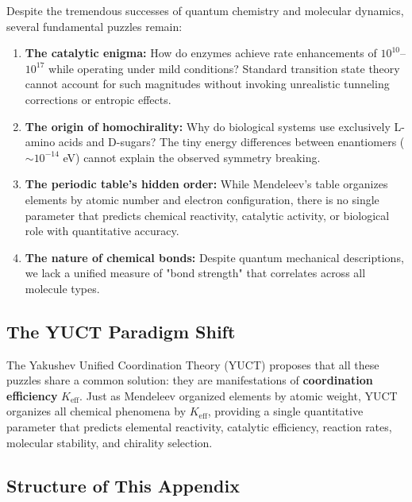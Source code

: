 \documentclass[12pt,a4paper]{article}
\theoremstyle{remark}
\newcommand{\Keff}{K_{\mathrm{eff}}}
\begin{document}
	Despite the tremendous successes of quantum chemistry and molecular dynamics, several fundamental puzzles remain:
	
	\begin{enumerate}
		\item \textbf{The catalytic enigma:} How do enzymes achieve rate enhancements of $10^{10}$--$10^{17}$ while operating under mild conditions? Standard transition state theory cannot account for such magnitudes without invoking unrealistic tunneling corrections or entropic effects.
		
		\item \textbf{The origin of homochirality:} Why do biological systems use exclusively L-amino acids and D-sugars? The tiny energy differences between enantiomers ($\sim 10^{-14}$ eV) cannot explain the observed symmetry breaking.
		
		\item \textbf{The periodic table's hidden order:} While Mendeleev's table organizes elements by atomic number and electron configuration, there is no single parameter that predicts chemical reactivity, catalytic activity, or biological role with quantitative accuracy.
		
		\item \textbf{The nature of chemical bonds:} Despite quantum mechanical descriptions, we lack a unified measure of "bond strength" that correlates across all molecule types.
	\end{enumerate}
	
	\subsection{The YUCT Paradigm Shift}
	
	The Yakushev Unified Coordination Theory (YUCT) proposes that all these puzzles share a common solution: they are manifestations of \textbf{coordination efficiency} $\Keff$. Just as Mendeleev organized elements by atomic weight, YUCT organizes all chemical phenomena by $\Keff$, providing a single quantitative parameter that predicts elemental reactivity, catalytic efficiency, reaction rates, molecular stability, and chirality selection.
	
	\subsection{Structure of This Appendix}
	
\end{document}
